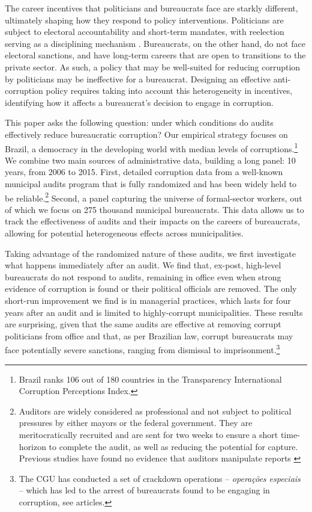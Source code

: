 The career incentives that politicians and bureaucrats face are starkly different, ultimately shaping how they respond to policy interventions. Politicians are subject to electoral accountability and short-term mandates, with reelection serving as a disciplining mechanism \citep{besley_principled_2006, ferraz_electoral_2007}. Bureaucrats, on the other hand, do not face electoral sanctions, and have long-term careers that are open to transitions to the private sector. As such, a policy that may be well-suited for reducing corruption by politicians may be ineffective for a bureaucrat. Designing an effective anti-corruption policy requires taking into account this heterogeneity in incentives, identifying how it affects a bureaucrat's decision to engage in corruption.

This paper asks the following question: under which conditions do audits effectively reduce bureaucratic corruption? Our empirical strategy focuses on Brazil, a democracy in the developing world with median levels of corruptions.\footnote{Brazil ranks 106 out of 180 countries in the Transparency International Corruption Perceptions Index.} We combine two main sources of administrative data, building a long panel: 10 years, from 2006 to 2015. First, detailed corruption data from a well-known municipal audits program  \citep[studied by e.g.][]{ferraz_exposing_2008, brollo2013political, zamboni_audit_2018} that is fully randomized and has been widely held to be reliable.\footnote{Auditors are widely considered as professional and not subject to political pressures by either mayors or the federal government. They are meritocratically recruited and are sent for two weeks to ensure a short time-horizon to complete the audit, as well as reducing the potential for capture. Previous studies have found no evidence that auditors manipulate reports \citep{avis_government_2018, ferraz_exposing_2008}} Second, a panel capturing the universe of formal-sector workers, out of which we focus on 275 thousand municipal bureaucrats. This data allows us to track the effectiveness of audits and their impacts on the careers of bureaucrats, allowing for potential heterogeneous effects across municipalities.

Taking advantage of the randomized nature of these audits, we first investigate what happens immediately after an audit. We find that, ex-post, high-level bureaucrats do not respond to audits, remaining in office even when strong evidence of corruption is found or their political officials are removed. The only short-run improvement we find is in managerial practices, which lasts for four years after an audit and is limited to highly-corrupt municipalities. These results are surprising, given that the same audits are effective at removing corrupt politicians from office and that, as per Brazilian law, corrupt bureaucrats may face potentially severe sanctions, ranging from dismissal to imprisonment.\footnote{The CGU has conducted a set of crackdown operations -- \emph{operações especiais} -- which has led to the arrest of bureaucrats found to be engaging in corruption, see articles.}

